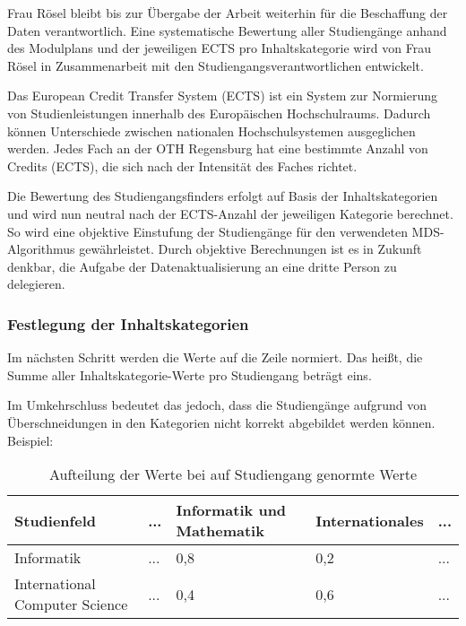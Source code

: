 Frau Rösel bleibt bis zur Übergabe der Arbeit weiterhin für die Beschaffung der Daten verantwortlich. Eine systematische Bewertung aller Studiengänge anhand des Modulplans und der jeweiligen ECTS pro Inhaltskategorie wird von Frau Rösel in Zusammenarbeit mit den Studiengangsverantwortlichen entwickelt.

Das European Credit Transfer System (ECTS) ist ein System zur Normierung von Studienleistungen innerhalb des Europäischen Hochschulraums. Dadurch können Unterschiede zwischen nationalen Hochschulsystemen ausgeglichen werden. \parencite{european_commission_europaisches_nodate} Jedes Fach an der OTH Regensburg hat eine bestimmte Anzahl von Credits (ECTS), die sich nach der Intensität des Faches richtet.

Die Bewertung des Studiengangsfinders erfolgt auf Basis der Inhaltskategorien und wird nun neutral nach der ECTS-Anzahl der jeweiligen Kategorie berechnet. So wird eine objektive Einstufung der Studiengänge für den verwendeten MDS-Algorithmus gewährleistet. Durch objektive Berechnungen ist es in Zukunft denkbar, die Aufgabe der Datenaktualisierung an eine dritte Person zu delegieren.

\subsubsection{Festlegung der Inhaltskategorien}
Im nächsten Schritt werden die Werte auf die Zeile normiert. Das heißt, die
Summe aller Inhaltskategorie-Werte pro Studiengang beträgt eins.

Im Umkehrschluss bedeutet das jedoch, dass die Studiengänge aufgrund von
Überschneidungen in den Kategorien nicht korrekt abgebildet werden können.
Beispiel:

\begin{table}[!ht]
    \centering
    \begin{tabular}{|l|l|l|l|l|}
    \hline
    \textbf{Studienfeld}           & \textbf{...} & \textbf{Informatik und Mathematik} & \textbf{Internationales} & \textbf{...} \\ \hline
    Informatik                     & ...          & 0,8                                & 0,2                      & ...          \\ \hline
    International Computer Science & ...          & 0,4                                & 0,6                      & ...          \\ \hline
    \end{tabular}

    \caption{Aufteilung der Werte bei auf Studiengang genormte Werte}
    \label{table:norm-values}
\end{table}

